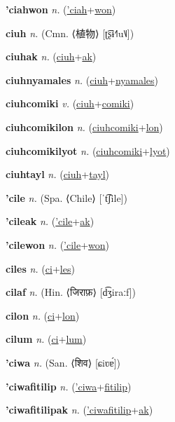 \textbf{\hypertarget{'ciahwon}{'ciahwon}} \textit{n.} (\hyperlink{'ciah}{'ciah}+\allowbreak \hyperlink{won}{won})


\textbf{\hypertarget{ciuh}{ciuh}} \textit{n.} (Cmn. ⟨{\chinese{}植物}⟩ [ʈ͡ʂɨ˧˥u˥˩])


\textbf{\hypertarget{ciuhak}{ciuhak}} \textit{n.} (\hyperlink{ciuh}{ciuh}+\allowbreak \hyperlink{ak}{ak})


\textbf{\hypertarget{ciuhnyamales}{ciuhnyamales}} \textit{n.} (\hyperlink{ciuh}{ciuh}+\allowbreak \hyperlink{nyamales}{nyamales})


\textbf{\hypertarget{ciuhcomiki}{ciuhcomiki}} \textit{v.} (\hyperlink{ciuh}{ciuh}+\allowbreak \hyperlink{comiki}{comiki})


\textbf{\hypertarget{ciuhcomikilon}{ciuhcomikilon}} \textit{n.} (\hyperlink{ciuhcomiki}{ciuhcomiki}+\allowbreak \hyperlink{lon}{lon})


\textbf{\hypertarget{ciuhcomikilyot}{ciuhcomikilyot}} \textit{n.} (\hyperlink{ciuhcomiki}{ciuhcomiki}+\allowbreak \hyperlink{lyot}{lyot})


\textbf{\hypertarget{ciuhtayl}{ciuhtayl}} \textit{n.} (\hyperlink{ciuh}{ciuh}+\allowbreak \hyperlink{tayl}{tayl})


\textbf{\hypertarget{'cile}{'cile}} \textit{n.} (Spa. ⟨Chile⟩ [ˈt͡ʃile])


\textbf{\hypertarget{'cileak}{'cileak}} \textit{n.} (\hyperlink{'cile}{'cile}+\allowbreak \hyperlink{ak}{ak})


\textbf{\hypertarget{'cilewon}{'cilewon}} \textit{n.} (\hyperlink{'cile}{'cile}+\allowbreak \hyperlink{won}{won})


\textbf{\hypertarget{ciles}{ciles}} \textit{n.} (\hyperlink{ci}{ci}+\allowbreak \hyperlink{les}{les})


\textbf{\hypertarget{cilaf}{cilaf}} \textit{n.} (Hin. ⟨{\devanagari{}जिराफ़}⟩ [d͡ʒiraːf])


\textbf{\hypertarget{cilon}{cilon}} \textit{n.} (\hyperlink{ci}{ci}+\allowbreak \hyperlink{lon}{lon})


\textbf{\hypertarget{cilum}{cilum}} \textit{n.} (\hyperlink{ci}{ci}+\allowbreak \hyperlink{lum}{lum})


\textbf{\hypertarget{'ciwa}{'ciwa}} \textit{n.} (San. ⟨{\devanagari{}शिव}⟩ [ɕiʋɐ́])


\textbf{\hypertarget{'ciwafitilip}{'ciwafitilip}} \textit{n.} (\hyperlink{'ciwa}{'ciwa}+\allowbreak \hyperlink{fitilip}{fitilip})


\textbf{\hypertarget{'ciwafitilipak}{'ciwafitilipak}} \textit{n.} (\hyperlink{'ciwafitilip}{'ciwafitilip}+\allowbreak \hyperlink{ak}{ak})



